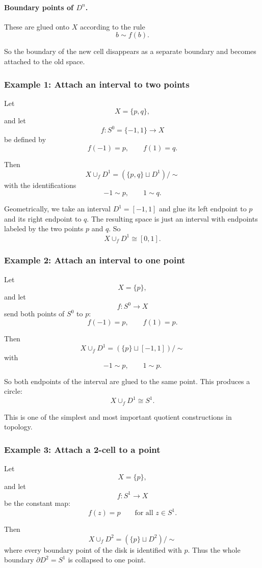 \documentclass[12pt,a4paper]{article}
\theoremstyle{notespace}
\begin{document}
\paragraph{Boundary points of \(D^n\).}
These are glued onto \(X\) according to the rule
\[
b\sim f(b).
\]

So the boundary of the new cell disappears as a separate boundary and becomes attached to the old space.

\subsubsection{Example 1: Attach an interval to two points}

Let
\[
X=\{p,q\},
\]
and let
\[
f:S^0=\{-1,1\}\to X
\]
be defined by
\[
f(-1)=p,
\qquad
f(1)=q.
\]

Then
\[
X\cup_f D^1 = (\{p,q\}\sqcup D^1)/\sim
\]
with the identifications
\[
-1\sim p,
\qquad
1\sim q.
\]

Geometrically, we take an interval \(D^1=[-1,1]\) and glue its left endpoint to \(p\) and its right endpoint to \(q\). The resulting space is just an interval with endpoints labeled by the two points \(p\) and \(q\). So
\[
X\cup_f D^1 \cong [0,1].
\]

\subsubsection{Example 2: Attach an interval to one point}

Let
\[
X=\{p\},
\]
and let
\[
f:S^0\to X
\]
send both points of \(S^0\) to \(p\):
\[
f(-1)=p,
\qquad
f(1)=p.
\]

Then
\[
X\cup_f D^1
=
(\{p\}\sqcup [-1,1])/\sim
\]
with
\[
-1\sim p,
\qquad
1\sim p.
\]

So both endpoints of the interval are glued to the same point. This produces a circle:
\[
X\cup_f D^1 \cong S^1.
\]

This is one of the simplest and most important quotient constructions in topology.

\subsubsection{Example 3: Attach a 2-cell to a point}

Let
\[
X=\{p\},
\]
and let
\[
f:S^1\to X
\]
be the constant map:
\[
f(z)=p
\qquad
\text{for all } z\in S^1.
\]

Then
\[
X\cup_f D^2
=
(\{p\}\sqcup D^2)/\sim
\]
where every boundary point of the disk is identified with \(p\). Thus the whole boundary \(\partial D^2=S^1\) is collapsed to one point.
\end{document}
